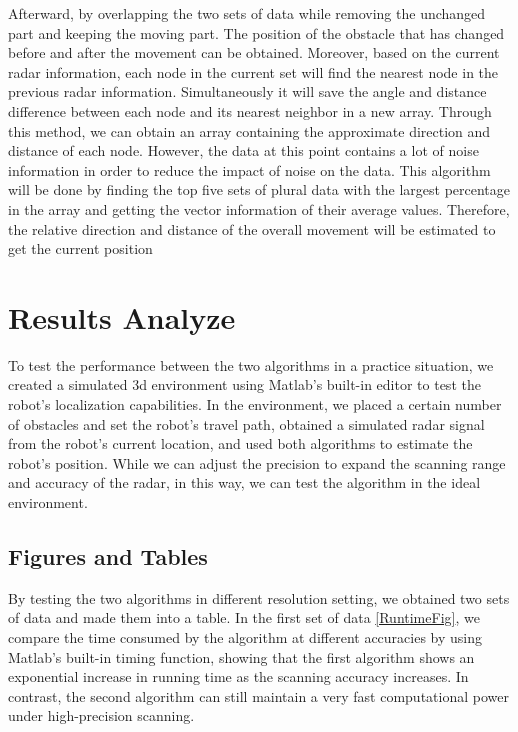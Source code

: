 \documentclass[conference]{IEEEtran}
\begin{document}
Afterward, by overlapping the two sets of data while removing the unchanged part and keeping the moving part. The position of the obstacle that has changed before and after the movement can be obtained. Moreover, based on the current radar information, each node in the current set will find the nearest node in the previous radar information. Simultaneously it will save the angle and distance difference between each node and its nearest neighbor in a new array. Through this method, we can obtain an array containing the approximate direction and distance of each node. However, the data at this point contains a lot of noise information in order to reduce the impact of noise on the data. This algorithm will be done by finding the top five sets of plural data with the largest percentage in the array and getting the vector information of their average values. Therefore, the relative direction and distance of the overall movement will be estimated to get the current position

\section{Results Analyze}
To test the performance between the two algorithms in a practice situation, we created a simulated 3d environment using Matlab's built-in editor to test the robot's localization capabilities. In the environment, we placed a certain number of obstacles and set the robot's travel path, obtained a simulated radar signal from the robot's current location, and used both algorithms to estimate the robot's position. While we can adjust the precision to expand the scanning range and accuracy of the radar, in this way, we can test the algorithm in the ideal environment.


\subsection{Figures and Tables}
By testing the two algorithms in different resolution setting, we obtained two sets of data and made them into a table. In the first set of data \ref{RuntimeFig}, we compare the time consumed by the algorithm at different accuracies by using Matlab's built-in timing function, showing that the first algorithm shows an exponential increase in running time as the scanning accuracy increases. In contrast, the second algorithm can still maintain a very fast computational power under high-precision scanning.
\end{document}
